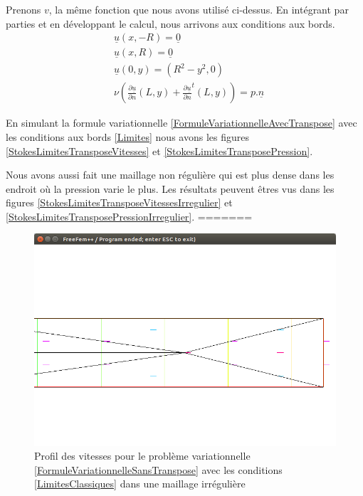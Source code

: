 \documentclass[11pt,a4paper]{article}
\numberwithin{equation}{subsection}
\numberwithin{figure}{subsection}
\begin{document}
Prenons $v$, la même fonction que nous avons utilisé ci-dessus. En intégrant par parties et en développant le calcul, nous arrivons aux conditions aux bords.
\begin{equation}
\begin{aligned}
& \underline{u}(x,-R) = \underline{0} \\
& \underline{u}(x, R) = \underline{0} \\
& \underline{u}(0,y) = \left(R^2 - y^2, 0\right) \\
& \nu\left(\frac{\partial\underline{u}}{\partial n}(L,y) + \frac{\partial\underline{u}}{\partial n}^t(L,y)\right) = p.\underline{n}
\end{aligned} \label{Limites}
\end{equation}

En simulant la formule variationnelle \ref{FormuleVariationnelleAvecTranspose} avec les conditions aux bords \ref{Limites} nous avons les figures \ref{StokesLimitesTransposeVitesses} et \ref{StokesLimitesTransposePression}.


Nous avons aussi fait une maillage non régulière qui est plus dense dans les endroit où la pression varie le plus. Les résultats peuvent êtres vus dans les figures \ref{StokesLimitesTransposeVitessesIrregulier} et \ref{StokesLimitesTransposePressionIrregulier}.
=======
\begin{figure}
\centering
\includegraphics[scale=0.4]{StokesConditionsClassiquesVitessesIrregulier.png}
\caption{Profil des vitesses pour le problème variationnelle \ref{FormuleVariationnelleSansTranspose} avec les conditions \ref{LimitesClassiques} dans une maillage irrégulière}
\label{StokesConditionsClassiquesVitessesIrregulier}
\end{figure}	
\end{document}

